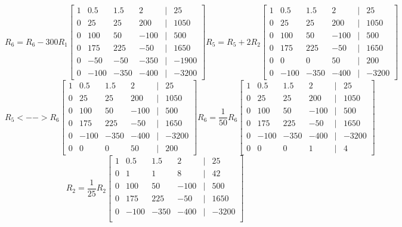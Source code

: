 \documentclass[11pt]{article}
\begin{document}
\begin{enumerate}
\begin{enumerate}
\[
    R_6 = R_6 - 300R_1
    \begin{bmatrix}
        1 & 0.5 & 1.5 & 2 &|& 25 \\
        0 & 25 & 25 & 200 &|& 1050 \\
        0 & 100 & 50 & -100 &|& 500 \\
        0 & 175 & 225 & -50 &|& 1650 \\
        0 & -50 & -50 & -350 &|& -1900 \\
        0 & -100 & -350 & -400 &|& -3200
    \end{bmatrix}
    R_5 = R_5 + 2R_2
    \begin{bmatrix}
        1 & 0.5 & 1.5 & 2 &|& 25 \\
        0 & 25 & 25 & 200 &|& 1050 \\
        0 & 100 & 50 & -100 &|& 500 \\
        0 & 175 & 225 & -50 &|& 1650 \\
        0 & 0 & 0 & 50 &|& 200 \\
        0 & -100 & -350 & -400 &|& -3200
    \end{bmatrix}
\]
\[
R_5 <--> R_6
\begin{bmatrix}
    1 & 0.5 & 1.5 & 2 &|& 25 \\
    0 & 25 & 25 & 200 &|& 1050 \\
    0 & 100 & 50 & -100 &|& 500 \\
    0 & 175 & 225 & -50 &|& 1650 \\
    0 & -100 & -350 & -400 &|& -3200\\
    0 & 0 & 0 & 50 &|& 200 
\end{bmatrix}
R_6 = \frac{1}{50}R_6
\begin{bmatrix}
    1 & 0.5 & 1.5 & 2 &|& 25 \\
    0 & 25 & 25 & 200 &|& 1050 \\
    0 & 100 & 50 & -100 &|& 500 \\
    0 & 175 & 225 & -50 &|& 1650 \\
    0 & -100 & -350 & -400 &|& -3200\\
    0 & 0 & 0 & 1 &|& 4
\end{bmatrix}
\]
\[
R_2 = \frac{1}{25}R_2
\begin{bmatrix}
    1 & 0.5 & 1.5 & 2 &|& 25 \\
    0 & 1 & 1 & 8 &|& 42 \\
    0 & 100 & 50 & -100 &|& 500 \\
    0 & 175 & 225 & -50 &|& 1650 \\
    0 & -100 & -350 & -400 &|& -3200\\

\end{bmatrix}\]
\end{enumerate}
\end{enumerate}
\end{document}

